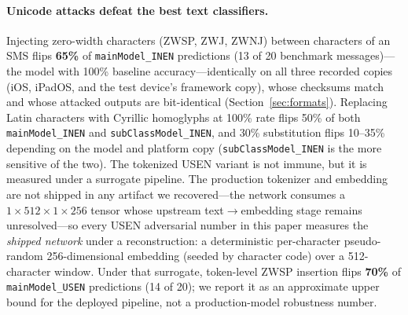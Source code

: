 \documentclass[letterpaper,twocolumn,10pt]{article}
\newcommand{\zwsp}{\mbox{ZWSP}\xspace}
\newcommand{\zwj}{\mbox{ZWJ}\xspace}
\newcommand{\zwnj}{\mbox{ZWNJ}\xspace}
\begin{document}
\paragraph{Unicode attacks defeat the best text classifiers.}
Injecting zero-width characters (\zwsp{}, \zwj{}, \zwnj{}) between
characters of an SMS flips \textbf{65\%} of \texttt{mainModel\_}\allowbreak\texttt{INEN}
predictions (13 of 20 benchmark messages)---the model with 100\% baseline
accuracy---identically on all three recorded copies (iOS, iPadOS, and the
test device's framework copy), whose checksums match and whose attacked
outputs are bit-identical (Section~\ref{sec:formats}).
Replacing Latin characters with Cyrillic homoglyphs at 100\% rate flips
50\% of both \texttt{mainModel\_}\allowbreak\texttt{INEN} and \texttt{subClassModel\_}\allowbreak\texttt{INEN}, and
30\% substitution flips 10--35\% depending on the model and platform copy
(\texttt{subClassModel\_}\allowbreak\texttt{INEN} is the more sensitive of the two).
The tokenized USEN variant is not immune, but it is measured under a
surrogate pipeline. The production tokenizer and embedding are not shipped
in any artifact we recovered---the network consumes a
$1{\times}512{\times}1{\times}256$ tensor whose upstream
text$\rightarrow$embedding stage remains unresolved---so every USEN
adversarial number in this paper measures the \emph{shipped network} under
a reconstruction: a deterministic per-character pseudo-random
256-dimensional embedding (seeded by character code) over a 512-character
window. Under that surrogate, token-level \zwsp{} insertion flips
\textbf{70\%} of \texttt{mainModel\_}\allowbreak\texttt{USEN} predictions (14 of 20); we report
it as an approximate upper bound for the deployed pipeline, not a
production-model robustness number.
\end{document}
